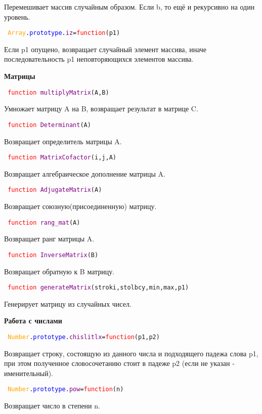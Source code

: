Перемешивает массив случайным образом. Если b, то ещё и рекурсивно на один уровень.

\hypertarget{iz}{\texttt{
		\textcolor{Orange}{Array}.\textcolor{Blue}{prototype}.\textcolor{Purple}{iz}=\textcolor{Red}{function}(p1)
	}}

Если p1 опущено, возвращает случайный элемент массива, иначе последовательность p1 неповторяющихся элементов массива.

\textbf{Матрицы}

\texttt{
	\textcolor{Red}{function} \textcolor{Purple}{multiplyMatrix}(A,B)
}

Умножает матрицу A на B, возвращает результат в матрице C.

\texttt{
	\textcolor{Red}{function} \textcolor{Purple}{Determinant}(A)
}

Возвращает определитель матрицы A.

\texttt{
	\textcolor{Red}{function} \textcolor{Purple}{MatrixCofactor}(i,j,A)
}

Возвращает алгебраическое дополнение матрицы A.

\texttt{
	\textcolor{Red}{function} \textcolor{Purple}{AdjugateMatrix}(A)
}

Возвращает союзную(присоединенную) матрицу.

\texttt{
	\textcolor{Red}{function} \textcolor{Purple}{rang\_mat}(А)
}

Возвращает ранг матрицы A.

\texttt{
	\textcolor{Red}{function} \textcolor{Purple}{InverseMatrix}(B)
}

Возвращает обратную  к B матрицу.

\texttt{
	\textcolor{Red}{function} \textcolor{Purple}{generateMatrix}(stroki,stolbcy,min,max,p1)
}

Генерирует матрицу из случайных чисел.

\textbf{Работа с числами}

\hypertarget{chislitlx}{\texttt{
	\textcolor{Orange}{Number}.\textcolor{Blue}{prototype}.\textcolor{Purple}{chislitlx}=\textcolor{Red}{function}(p1,p2)
}}

Возвращает строку, состоящую из данного числа и подходящего падежа слова p1, при этом
полученное словосочетанию стоит в падеже p2 (если не указан - именительный).

\texttt{
	\textcolor{Orange}{Number}.\textcolor{Blue}{prototype}.\textcolor{Purple}{pow}=\textcolor{Red}{function}(n)
}

Возвращает число в степени n.

